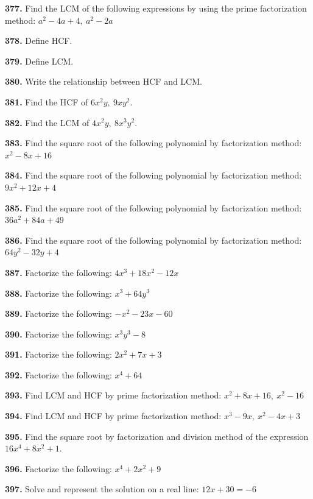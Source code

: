\documentclass[11pt]{article}
\begin{document}
\bigskip
\noindent\textbf{377.} Find the LCM of the following expressions by using the prime factorization method: $a^2-4a+4,\ a^2-2a$

\bigskip
\noindent\textbf{378.} Define HCF.

\bigskip
\noindent\textbf{379.} Define LCM.

\bigskip
\noindent\textbf{380.} Write the relationship between HCF and LCM.

\bigskip
\noindent\textbf{381.} Find the HCF of $6x^2y,\ 9xy^2$.

\bigskip
\noindent\textbf{382.} Find the LCM of $4x^2y,\ 8x^3y^2$.

\bigskip
\noindent\textbf{383.} Find the square root of the following polynomial by factorization method: $x^2-8x+16$

\bigskip
\noindent\textbf{384.} Find the square root of the following polynomial by factorization method: $9x^2+12x+4$

\bigskip
\noindent\textbf{385.} Find the square root of the following polynomial by factorization method: $36a^2+84a+49$

\bigskip
\noindent\textbf{386.} Find the square root of the following polynomial by factorization method: $64y^2-32y+4$

\bigskip
\noindent\textbf{387.} Factorize the following: $4x^3+18x^2-12x$

\bigskip
\noindent\textbf{388.} Factorize the following: $x^3+64y^3$

\bigskip
\noindent\textbf{389.} Factorize the following: $-x^2-23x-60$

\bigskip
\noindent\textbf{390.} Factorize the following: $x^3y^3-8$

\bigskip
\noindent\textbf{391.} Factorize the following: $2x^2+7x+3$

\bigskip
\noindent\textbf{392.} Factorize the following: $x^4+64$

\bigskip
\noindent\textbf{393.} Find LCM and HCF by prime factorization method: $x^2+8x+16,\ x^2-16$

\bigskip
\noindent\textbf{394.} Find LCM and HCF by prime factorization method: $x^3-9x,\ x^2-4x+3$

\bigskip
\noindent\textbf{395.} Find the square root by factorization and division method of the expression $16x^4+8x^2+1$.

\bigskip
\noindent\textbf{396.} Factorize the following: $x^4+2x^2+9$

\bigskip
\noindent\textbf{397.} Solve and represent the solution on a real line: $12x+30=-6$
\end{document}
